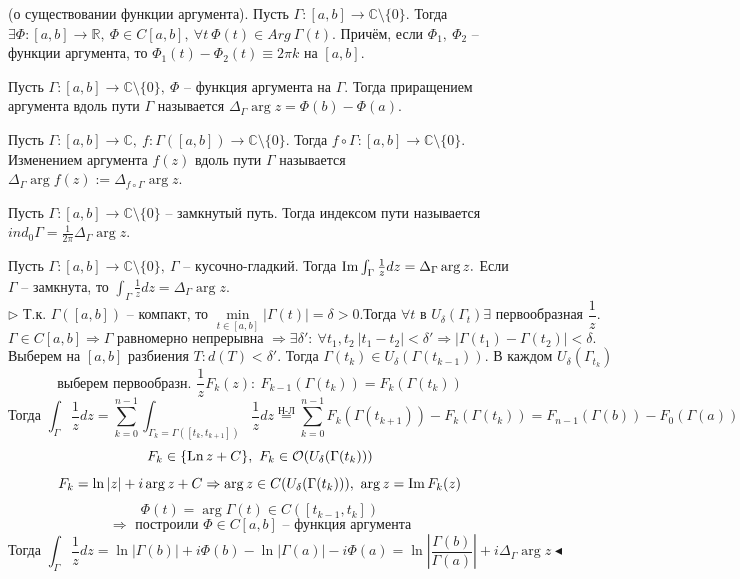  (о существовании функции аргумента). Пусть $\Gamma:[a, b] \to \mathbb{C} \setminus\{0\}$. Тогда $\exists \Phi: [a, b] \to \mathbb{R}, \ \Phi \in C[a, b], \ \forall t \ \Phi(t) \in Arg \ \Gamma(t).$
Причём, если $\Phi_1, \ \Phi_2$ -- функции аргумента, то $\Phi_1(t) - \Phi_2(t) \equiv 2\pi k \text{ на } [a, b].$

 Пусть $\Gamma:[a, b]\to \mathbb{C}\setminus\{0\}, \ \Phi$ -- функция аргумента на $\Gamma.$ Тогда приращением аргумента вдоль пути $\Gamma$ называется $\Delta_\Gamma \arg z = \Phi(b) - \Phi(a).$

 Пусть $\Gamma:[a, b]\to \mathbb{C}, \ f:\Gamma([a, b])\to \mathbb{C}\setminus\{0\}.$ Тогда $f \circ \Gamma : [a, b] \to \mathbb{C}\setminus \{0\}$. Изменением аргумента $f(z)$ вдоль пути $\Gamma$ называется $\Delta_\Gamma \arg f(z) := \Delta_{f \circ \Gamma} \arg z.$

 Пусть $\Gamma:[a, b] \to \mathbb{C}\setminus\{0\}$ -- замкнутый путь. Тогда индексом пути называется $ind_0 \Gamma = \frac{1}{2\pi} \Delta_{\Gamma} \arg z.$

 Пусть $\Gamma:[a, b]\to \mathbb{C}\setminus\{0\}, \ \Gamma$ -- кусочно-гладкий. Тогда $\operatorname{Im} \int_\Gamma \frac{1}{z} dz = \Delta_\Gamma \arg z.$
Если $\Gamma$ -- замкнута, то $\int_\Gamma \frac{1}{z} dz = \Delta_\Gamma \arg z.$
\[\triangleright \text{ Т.к. $\Gamma([a, b])$ -- компакт, то } \min_{t\in[a, b]}|\Gamma(t)| = \delta > 0. \text{Тогда } \forall t \text{ в } U_\delta(\Gamma_t) \exists \text{ первообразная } \frac{1}{z}.\]
\[\Gamma \in C[a, b] \Rightarrow \Gamma \text{ равномерно непрерывна } \Rightarrow \exists \delta': \ \forall t_1, t_2 \ |t_1-t_2| < \delta' \Rightarrow \left|\Gamma(t_1)-\Gamma(t_2)\right| < \delta.\]
\[\text{Выберем на $[a, b]$ разбиения } T: d(T) <\delta'. \text{ Тогда } \Gamma(t_k) \in U_\delta(\Gamma(t_{k-1})) \text{. В каждом $U_\delta(\Gamma_{t_k}) $}\]
\[\text{выберем первообразн. } \frac{1}{z} F_k(z): \ F_{k-1}(\Gamma(t_k)) = F_k(\Gamma(t_k))\]
\[\text{Тогда } \int_\Gamma \frac{1}{z} dz = \sum_{k=0}^{n-1} \int_{\Gamma_k = \Gamma([t_k, t_{k+1}])} \frac{1}{z} dz \overset{\text{Н-Л}}{=} \sum_{k=0}^{n-1} F_k(\Gamma(t_{k+1})) - F_k(\Gamma(t_k)) = F_{n-1}(\Gamma(b)) - F_0(\Gamma(a))\]
\[F_k \in \{\operatorname{Ln} z + C\}, \ F_k \in \mathcal{O}(U_\delta(\Gamma(t_k)))\]
\[F_k = \ln |z| + i\arg z + C \Rightarrow \arg z \in C(U_\delta(\Gamma(t_k))), \ \arg z = \operatorname{Im} F_k(z)\]
\[\Phi(t) = \arg \Gamma(t) \in C([t_{k-1}, t_k])\]
\[\Rightarrow \text{ построили } \Phi \in C[a, b] \text{ -- функция аргумента}\]
\[\text{Тогда } \int_\Gamma \frac{1}{z} dz = \ln \left|\Gamma(b)\right| + i\Phi(b) - \ln \left|\Gamma(a)\right|-i\Phi(a) = \ln\left|\frac{\Gamma(b)}{\Gamma(a)}\right| + i\Delta_\Gamma \arg z \blacktriangleleft\]
